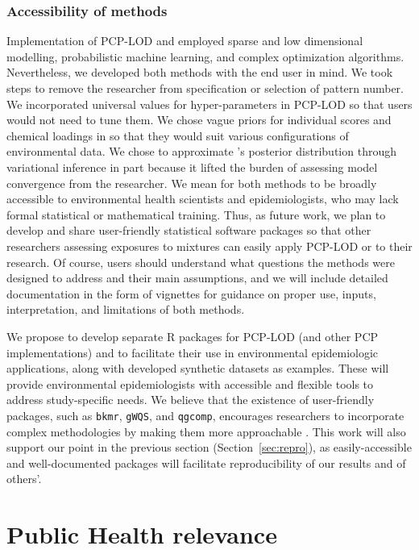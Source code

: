 \subsubsection{Accessibility of methods}\label{diss:access}
Implementation of PCP-LOD and \bnmf employed sparse and low dimensional modelling, probabilistic machine learning, and complex optimization algorithms. Nevertheless, we developed both methods with the end user in mind. We took steps to remove the researcher from specification or selection of pattern number. We incorporated universal values for hyper-parameters in PCP-LOD so that users would not need to tune them. We chose vague priors for individual scores and chemical loadings in \bnmf so that they would suit various configurations of environmental data. We chose to approximate \bnmfc's posterior distribution through variational inference in part because it lifted the burden of assessing model convergence from the researcher. We mean for both methods to be broadly accessible to environmental health scientists and epidemiologists, who may lack formal statistical or mathematical training. Thus, as future work, we plan to develop and share user-friendly statistical software packages so that other researchers assessing exposures to mixtures can easily apply PCP-LOD or \bnmf to their research. Of course, users should understand what questions the methods were designed to address and their main assumptions, and we will include detailed documentation in the form of vignettes for guidance on proper use, inputs, interpretation, and limitations of both methods.

We propose to develop separate R packages for PCP-LOD (and other PCP implementations) and \bnmf to facilitate their use in environmental epidemiologic applications, along with developed synthetic datasets as examples. These will provide environmental epidemiologists with accessible and flexible tools to address study-specific needs. We believe that the existence of user-friendly packages, such as \texttt{bkmr}, \texttt{gWQS}, and \texttt{qgcomp}, encourages researchers to incorporate complex methodologies by making them more approachable \cite{bobb2018statistical, renzetti2016gwqs, keil2020quantile}. This work will also support our point in the previous section (Section~\ref{sec:repro}), as easily-accessible and well-documented packages will facilitate reproducibility of our results and of others'.

\section{Public Health relevance}\label{sec:ph}
